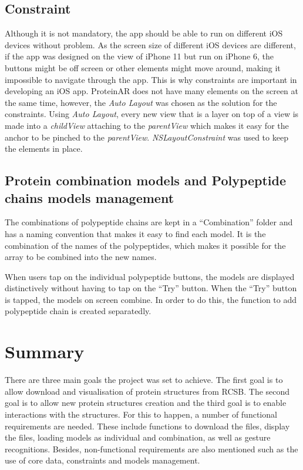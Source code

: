 \subsection{Constraint}
Although it is not mandatory, the app should be able to run on different iOS devices without problem. As the screen size of different iOS devices are different, if the app was designed on the view of iPhone 11 but run on iPhone 6, the buttons might be off screen or other elements might move around, making it impossible to navigate through the app. This is why constraints are important in developing an iOS app. ProteinAR does not have many elements on the screen at the same time, however, the \emph{Auto Layout} was chosen as the solution for the constraints. Using \emph{Auto Layout}, every new view that is a layer on top of a view is made into a \emph{childView} attaching to the \emph{parentView} which makes it easy for the anchor to be pinched to the \emph{parentView}. \emph{NSLayoutConstraint} was used to keep the elements in place. 

\subsection{Protein combination models and Polypeptide chains models management}
The combinations of polypeptide chains are kept in a “Combination” folder and has a naming convention that makes it easy to find each model. It is the combination of the names of the polypeptides, which makes it possible for the array to be combined into the new names. 

When users tap on the individual polypeptide buttons, the models are displayed distinctively without having to tap on the “Try” button. When the “Try” button is tapped, the models on screen combine. In order to do this, the function to add polypeptide chain is created separatedly. 

\section{Summary}
 There are three main goals the project was set to achieve. The first goal is to allow download and visualisation of protein structures from RCSB. The second goal is to allow new protein structures creation and the third goal is to enable interactions with the structures. For this to happen, a number of functional requirements are needed. These include functions to download the files, display the files, loading models as individual and combination, as well as gesture recognitions. Besides, non-functional requirements are also mentioned such as the use of core data, constraints and models management. 
